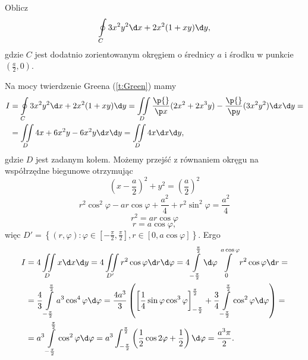 \begin{example}
    Oblicz
    \[ \oint\limits_C 3x^2y^2 \d x + 2x^2(1 + xy) \d y, \]
    gdzie $C$ jest dodatnio zorientowanym okręgiem o średnicy $a$ i środku w punkcie $(\frac{a}{2}, 0)$.
\end{example}
\begin{solution}
    Na mocy twierdzenie Greena (\ref{t:Green}) mamy
    \begin{align*}
        I &= \oint\limits_C 3x^2y^2 \d x + 2x^2(1 + xy) \d y = \iint\limits_D \frac{\p{}}{\p x}(2x^2 + 2x^3y) - \frac{\p{}}{\p y}(3x^2y^2) \d x \d y = \\
        &= \iint\limits_D 4x + 6x^2y - 6x^2y \d x \d y = \iint\limits_D 4x \d x \d y,
    \end{align*}
    gdzie $D$ jest zadanym kołem. Możemy przejść z równaniem okręgu na współrzędne biegunowe otrzymując
    \[ \left(x - \frac{a}{2}\right)^2 + y^2 = \left(\frac{a}{2}\right)^2 \]
    \[ r^2\cos^2\varphi - ar\cos\varphi + \frac{a^2}{4} + r^2\sin^2\varphi = \frac{a^2}{4} \]
    \[ r^2 = ar\cos\varphi \]
    \[ r = a\cos\varphi, \]
    więc $D' = \left\{(r, \varphi) : \varphi \in \left[-\frac{\pi}{2}, \frac{\pi}{2}\right], r \in [0, a\cos\varphi]\right\}$. Ergo
    \begin{align*}
        I &= 4\iint\limits_D x \d x \d y = 4\iint\limits_{D'} r^2\cos\varphi \d r \d \varphi = 4\int\limits_{-\frac{\pi}{2}}^{\frac{\pi}{2}} \d \varphi \int\limits_0^{a\cos\varphi} r^2\cos\varphi \d r = \\
        &= \frac{4}{3}\int\limits_{-\frac{\pi}{2}}^{\frac{\pi}{2}} a^3\cos^4\varphi \d \varphi = \frac{4a^3}{3}\left(\left[\frac{1}{4}\sin\varphi \cos^3\varphi\right]_{-\frac{\pi}{2}}^{\frac{\pi}{2}} + \frac{3}{4}\int\limits_{-\frac{\pi}{2}}^{\frac{\pi}{2}} \cos^2 \varphi \d \varphi\right) = \\
        &= a^3 \int\limits_{-\frac{\pi}{2}}^{\frac{\pi}{2}} \cos^2 \varphi \d \varphi = a^3 \int_{-\frac{\pi}{2}}^{\frac{\pi}{2}} \left(\frac{1}{2}\cos 2\varphi + \frac{1}{2}\right) \d \varphi = \frac{a^3\pi}{2}.
    \end{align*}
\end{solution}

